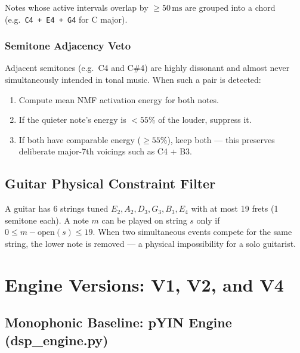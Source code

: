 \documentclass[12pt, a4paper]{article}
\begin{document}
Notes whose active intervals overlap by $\geq 50\,\text{ms}$ are grouped
into a chord (e.g.\ \texttt{C4 + E4 + G4} for C major).

\subsubsection{Semitone Adjacency Veto}

Adjacent semitones (e.g.\ C4 and C\#4) are highly dissonant and almost
never simultaneously intended in tonal music. When such a pair is detected:
\begin{enumerate}[leftmargin=2em]
  \item Compute mean NMF activation energy for both notes.
  \item If the quieter note's energy is $< 55\%$ of the louder, suppress it.
  \item If both have comparable energy ($\geq 55\%$), keep both --- this
        preserves deliberate major-7th voicings such as C4 + B3.
\end{enumerate}

\subsection{Guitar Physical Constraint Filter}

A guitar has 6 strings tuned $E_2, A_2, D_3, G_3, B_3, E_4$ with at most
19 frets (1 semitone each). A note $m$ can be played on string $s$ only
if $0 \leq m - \text{open}(s) \leq 19$. When two simultaneous events
compete for the same string, the lower note is removed --- a physical
impossibility for a solo guitarist.

\section{Engine Versions: V1, V2, and V4}

\subsection{Monophonic Baseline: pYIN Engine (dsp\_engine.py)}
\end{document}
